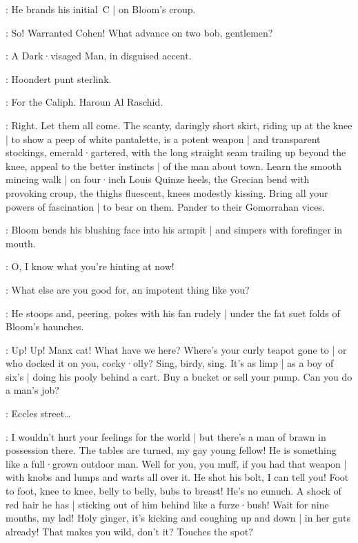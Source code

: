 :
He brands his initial~C |
on Bloom's croup.

\Bello:
So!
Warranted Cohen!
What advance on two bob,
gentlemen?

:
A Dark·visaged Man,
in disguised accent.

\DarkvisagedMan:
Hoondert punt sterlink.

\Voices:
For the Caliph.
Haroun Al Raschid.

\Bello:
Right.
Let them all come.
The scanty,
daringly short skirt,
riding up at the knee |
to show a peep of white pantalette,
is a potent weapon |
and transparent stockings,
emerald·gartered,
with the long straight seam trailing up beyond the knee,
appeal to the better instincts |
of the  man about town.
Learn the smooth mincing walk |
on four·inch Louis Quinze heels,
the Grecian bend with provoking croup,
%
the thighs fluescent,
knees modestly kissing.
Bring all your powers of fascination |
to bear on them.
Pander to their Gomorrahan vices.

:
Bloom bends his blushing face into his armpit |
and simpers with forefinger in mouth.

\Bloom:
O,
I know what you're hinting at now!

\Bello:
What else are you good for,
an impotent thing like you?

:
He stoops and,
peering,
pokes with his fan rudely |
under the fat suet folds of Bloom's haunches.

\Bello:
Up!
Up!
Manx cat!
What have we here?
Where's your curly teapot gone to |
or who docked it on you,
cocky·olly?
Sing,
birdy,
sing.
%
It's as limp |
as a boy of six's |
doing his pooly behind a cart.
Buy a bucket or sell your pump.
Can you do a man's job?

\Bloom:
Eccles street…

\Bello:
I wouldn't hurt your feelings for the world |
but there's a man of brawn in possession there.
The tables are turned,
my gay young fellow!
He is something like a full·grown outdoor man.
Well for you,
you muff,
if you had that weapon |
with knobs and lumps and warts all over it.
He shot his bolt,
I can tell you!
%
Foot to foot,
knee to knee,
belly to belly,
bubs to breast!
He's no eunuch.
A shock of red hair he has |
sticking out of him behind like a furze·bush!
Wait for nine months,
my lad!
Holy ginger,
it's kicking and coughing up and down |
in her guts already!
That makes you wild,
don't it?
Touches the spot?

